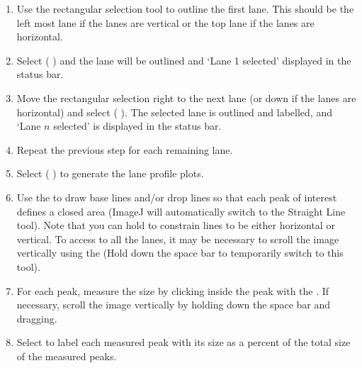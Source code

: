 \begin{enumerate}
\item Use the rectangular selection tool to outline the first lane. This
should be the left most lane if the lanes are vertical or the top
lane if the lanes are horizontal. 
\item Select (\,\,)
and the lane will be outlined and `Lane 1 selected' displayed in
the status bar. 
\item Move the rectangular selection right to the next lane (or down if
the lanes are horizontal) and select
(\,\,). The selected lane is outlined and labelled,
and `Lane $n$ selected' is displayed in the status bar.
\item Repeat the previous step for each remaining lane. 
\item Select  (\,\,)
to generate the lane profile plots. 
\item Use the  to draw base lines
and/or drop lines so that each peak of interest defines a closed area
(ImageJ will automatically switch to the Straight Line tool). Note
that you can hold  to constrain lines to be either
horizontal or vertical. To access to all the lanes, it may be necessary
to scroll the image vertically using the 
(Hold down the space bar to temporarily switch to this tool). 
\item For each peak, measure the size by clicking inside the peak with the
. If necessary, scroll the image vertically
by holding down the space bar and dragging. 
\item Select  to label each
measured peak with its size as a percent of the total size of the
measured peaks. 
\end{enumerate}




